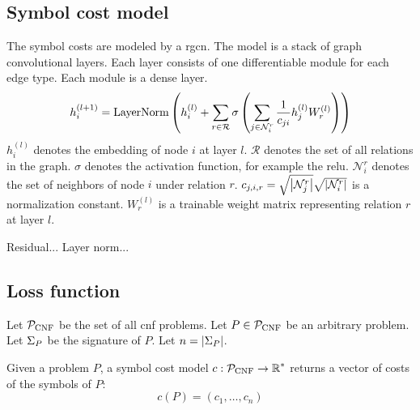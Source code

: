 \subsection{Symbol cost model}

The symbol costs are modeled by a \gls{rgcn}.\cite{Schlichtkrull2017}
The model is a stack of graph convolutional layers.
Each layer consists of one differentiable module for each edge type.
Each module is a dense layer.
$$
h_i^{(l+1)} =
\mathrm{LayerNorm} \left(h_i^{(l)} + \sum_{r \in \mathcal{R}} \sigma \left(\sum_{j \in \mathcal{N}_i^r} \frac{1}{c_{ji}} h_j^{(l)} W_r^{(l)}\right)\right)
$$
$h_i^{(l)}$ denotes the embedding of node $i$ at layer $l$.
$\mathcal{R}$ denotes the set of all relations in the graph.
$\sigma$ denotes the activation function, for example the \gls{relu}.
$\mathcal{N}_i^r$ denotes the set of neighbors of node $i$ under relation $r$.
$c_{j, i, r} = \sqrt{\left|\mathcal{N}_j^r\right|} \sqrt{\left|\mathcal{N}_i^r\right|}$ is a normalization constant.\cite{kipf2017semisupervised}
$W_r^{(l)}$ is a trainable weight matrix representing relation $r$ at layer $l$.

Residual...
Layer norm...


\subsection{Loss function} 
\label{sec:loss}

Let $\operatorname{\mathcal{P}_{\mathrm{CNF}}}$ be the set of all \gls{cnf} problems.
Let $P \in \operatorname{\mathcal{P}_{\mathrm{CNF}}}$ be an arbitrary problem.
Let $\Sigma_P$ be the signature of $P$.
Let $n = \left|\Sigma_P\right|$.

Given a problem $P$, a symbol cost model 
$c : \operatorname{\mathcal{P}_{\mathrm{CNF}}} \to \operatorname{\mathbb{R}}^*$
returns a vector of costs of the symbols of $P$:
$$
c(P) = (c_1, \ldots, c_n)
$$

